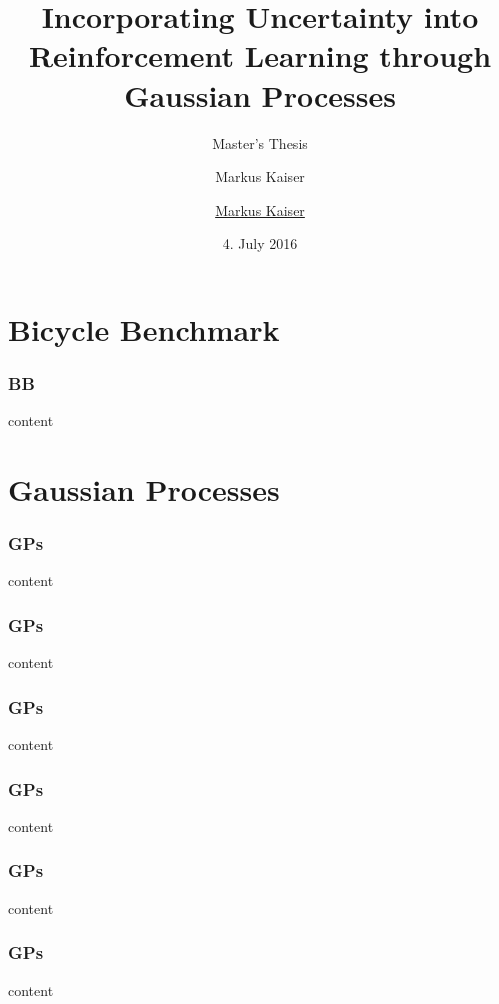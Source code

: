 



\title{Incorporating Uncertainty into Reinforcement Learning through Gaussian Processes}
\author{Markus Kaiser}
\subtitle{Master's Thesis}
\author{\href{mailto:markus.kaiser@in.tum.de}{Markus Kaiser}}
\date{4. July 2016}



\begin{frame}[plain]
    \titlepage
\end{frame}

\section{Bicycle Benchmark}
\begin{frame}
    \frametitle{BB}

    content
\end{frame}

\section{Gaussian Processes}
\begin{frame}
    \frametitle{GPs}

    content
\end{frame}
\begin{frame}
    \frametitle{GPs}

    content
\end{frame}
\begin{frame}
    \frametitle{GPs}

    content
\end{frame}
\begin{frame}
    \frametitle{GPs}

    content
\end{frame}
\begin{frame}
    \frametitle{GPs}

    content
\end{frame}
\begin{frame}
    \frametitle{GPs}

    content
\end{frame}

